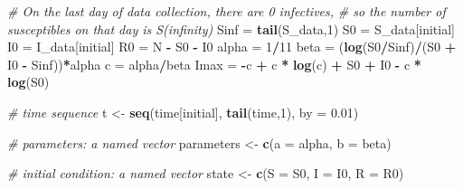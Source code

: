 \documentclass[
]{article}
\newenvironment{Shaded}{\begin{snugshade}}{\end{snugshade}}
\newcommand{\CommentTok}[1]{\textcolor[rgb]{0.56,0.35,0.01}{\textit{#1}}}
\newcommand{\DataTypeTok}[1]{\textcolor[rgb]{0.13,0.29,0.53}{#1}}
\newcommand{\DecValTok}[1]{\textcolor[rgb]{0.00,0.00,0.81}{#1}}
\newcommand{\FloatTok}[1]{\textcolor[rgb]{0.00,0.00,0.81}{#1}}
\newcommand{\KeywordTok}[1]{\textcolor[rgb]{0.13,0.29,0.53}{\textbf{#1}}}
\newcommand{\NormalTok}[1]{#1}
\newcommand{\OperatorTok}[1]{\textcolor[rgb]{0.81,0.36,0.00}{\textbf{#1}}}
\newcommand{\StringTok}[1]{\textcolor[rgb]{0.31,0.60,0.02}{#1}}
\begin{document}
\begin{Shaded}
\begin{Highlighting}[]
\CommentTok{# On the last day of data collection, there are 0 infectives, }
\CommentTok{# so the number of susceptibles on that day is S(infinity)}
\NormalTok{Sinf =}\StringTok{ }\KeywordTok{tail}\NormalTok{(S_data,}\DecValTok{1}\NormalTok{)}
\NormalTok{S0 =}\StringTok{ }\NormalTok{S_data[initial]}
\NormalTok{I0 =}\StringTok{ }\NormalTok{I_data[initial]}
\NormalTok{R0 =}\StringTok{ }\NormalTok{N }\OperatorTok{-}\StringTok{ }\NormalTok{S0 }\OperatorTok{-}\StringTok{ }\NormalTok{I0}
\NormalTok{alpha =}\StringTok{ }\DecValTok{1}\OperatorTok{/}\DecValTok{11}
\NormalTok{beta =}\StringTok{ }\NormalTok{(}\KeywordTok{log}\NormalTok{(S0}\OperatorTok{/}\NormalTok{Sinf)}\OperatorTok{/}\NormalTok{(S0 }\OperatorTok{+}\StringTok{ }\NormalTok{I0 }\OperatorTok{-}\StringTok{ }\NormalTok{Sinf))}\OperatorTok{*}\NormalTok{alpha}
\NormalTok{c =}\StringTok{ }\NormalTok{alpha}\OperatorTok{/}\NormalTok{beta}
\NormalTok{Imax =}\StringTok{ }\OperatorTok{-}\NormalTok{c }\OperatorTok{+}\StringTok{ }\NormalTok{c }\OperatorTok{*}\StringTok{ }\KeywordTok{log}\NormalTok{(c) }\OperatorTok{+}\StringTok{ }\NormalTok{S0 }\OperatorTok{+}\StringTok{ }\NormalTok{I0 }\OperatorTok{-}\StringTok{ }\NormalTok{c }\OperatorTok{*}\StringTok{ }\KeywordTok{log}\NormalTok{(S0)}

\CommentTok{# time sequence }
\NormalTok{t <-}\StringTok{ }\KeywordTok{seq}\NormalTok{(time[initial], }\KeywordTok{tail}\NormalTok{(time,}\DecValTok{1}\NormalTok{), }\DataTypeTok{by =} \FloatTok{0.01}\NormalTok{)}

\CommentTok{# parameters: a named vector}
\NormalTok{parameters <-}\StringTok{ }\KeywordTok{c}\NormalTok{(}\DataTypeTok{a =}\NormalTok{ alpha, }\DataTypeTok{b =}\NormalTok{ beta)}

\CommentTok{# initial condition: a named vector}
\NormalTok{state <-}\StringTok{ }\KeywordTok{c}\NormalTok{(}\DataTypeTok{S =}\NormalTok{ S0, }\DataTypeTok{I =}\NormalTok{ I0, }\DataTypeTok{R =}\NormalTok{ R0)}


\end{Highlighting}
\end{Shaded}
\end{document}
